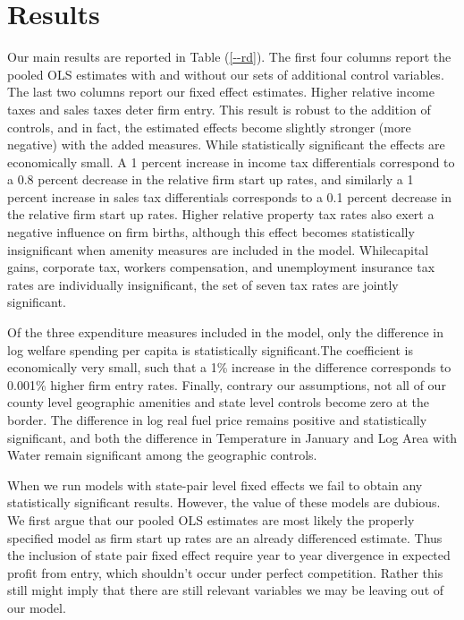 \section{Results}

Our main results are reported in Table (\ref{--rd}). The first four columns report the pooled OLS estimates with and without our sets of additional control variables. The last two columns report our fixed effect estimates. Higher relative income taxes and sales taxes deter firm entry.  This result is robust to the addition of controls, and in fact, the estimated effects become slightly stronger (more negative) with the added measures.  While statistically significant the effects are economically small.  A 1 percent increase in income tax differentials correspond to a 0.8 percent decrease in the relative firm start up rates, and similarly a 1 percent increase in sales tax differentials corresponds to a 0.1 percent decrease in the relative firm start up rates.  Higher relative property tax rates also exert a negative influence on firm births, although this effect becomes statistically insignificant when amenity measures are included in the model. Whilecapital gains, corporate tax, workers compensation, and unemployment insurance tax rates are individually insignificant, the set of seven tax rates are jointly  significant.

Of the three expenditure measures included in the model, only the difference in log welfare spending per capita is statistically significant.The coefficient is economically very small, such that a 1\% increase in the difference corresponds to 0.001\% higher firm entry rates. Finally, contrary our assumptions, not all of our county level geographic amenities and state level controls become zero at the border. The difference in log real fuel price remains positive and statistically significant, and both the difference in Temperature in January and Log Area with Water remain significant among the geographic controls. 

When we run models with state-pair level fixed effects we fail to obtain any statistically significant results. However, the value of these models are dubious. We first argue that our pooled OLS estimates are most likely the properly specified model as firm start up rates are an already differenced estimate. Thus the inclusion of state pair fixed effect require year to year divergence in expected profit from entry, which shouldn’t occur under perfect competition. Rather this still might imply that there are still relevant variables we may be leaving out of our model.

